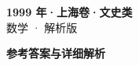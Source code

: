\documentclass[zihao=-4, a4paper]{ctexart}
\begin{document}
\begin{center}
  {\Large\bfseries 1999 年·上海卷·文史类}\\[4pt]
  {\large 数学 · 解析版}
\end{center}
\medskip
{}

\clearpage
{}
\begin{center}{\Large\bfseries 参考答案与详细解析}\end{center}
\medskip

\end{document}
